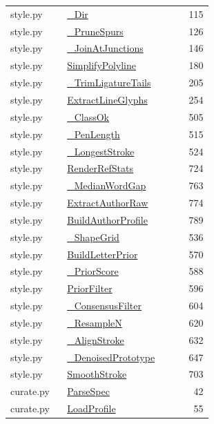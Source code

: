 \documentclass[11pt,a4paper,oneside]{report}
\begin{document}
\begin{longtable}{p{0.28\linewidth}p{0.48\linewidth}r}
style.py & \hyperref[fn:style:-Dir]{\_Dir} & 115\\
style.py & \hyperref[fn:style:-PruneSpurs]{\_PruneSpurs} & 126\\
style.py & \hyperref[fn:style:-JoinAtJunctions]{\_JoinAtJunctions} & 146\\
style.py & \hyperref[fn:style:SimplifyPolyline]{SimplifyPolyline} & 180\\
style.py & \hyperref[fn:style:-TrimLigatureTails]{\_TrimLigatureTails} & 205\\
style.py & \hyperref[fn:style:ExtractLineGlyphs]{ExtractLineGlyphs} & 254\\
style.py & \hyperref[fn:style:-ClassOk]{\_ClassOk} & 505\\
style.py & \hyperref[fn:style:-PenLength]{\_PenLength} & 515\\
style.py & \hyperref[fn:style:-LongestStroke]{\_LongestStroke} & 524\\
style.py & \hyperref[fn:style:RenderRefStats]{RenderRefStats} & 724\\
style.py & \hyperref[fn:style:-MedianWordGap]{\_MedianWordGap} & 763\\
style.py & \hyperref[fn:style:ExtractAuthorRaw]{ExtractAuthorRaw} & 774\\
style.py & \hyperref[fn:style:BuildAuthorProfile]{BuildAuthorProfile} & 789\\
style.py & \hyperref[fn:style:-ShapeGrid]{\_ShapeGrid} & 536\\
style.py & \hyperref[fn:style:BuildLetterPrior]{BuildLetterPrior} & 570\\
style.py & \hyperref[fn:style:-PriorScore]{\_PriorScore} & 588\\
style.py & \hyperref[fn:style:PriorFilter]{PriorFilter} & 596\\
style.py & \hyperref[fn:style:-ConsensusFilter]{\_ConsensusFilter} & 604\\
style.py & \hyperref[fn:style:-ResampleN]{\_ResampleN} & 620\\
style.py & \hyperref[fn:style:-AlignStroke]{\_AlignStroke} & 632\\
style.py & \hyperref[fn:style:-DenoisedPrototype]{\_DenoisedPrototype} & 647\\
style.py & \hyperref[fn:style:SmoothStroke]{SmoothStroke} & 703\\
curate.py & \hyperref[fn:curate:ParseSpec]{ParseSpec} & 42\\
curate.py & \hyperref[fn:curate:LoadProfile]{LoadProfile} & 55\\

\end{longtable}
\end{document}
